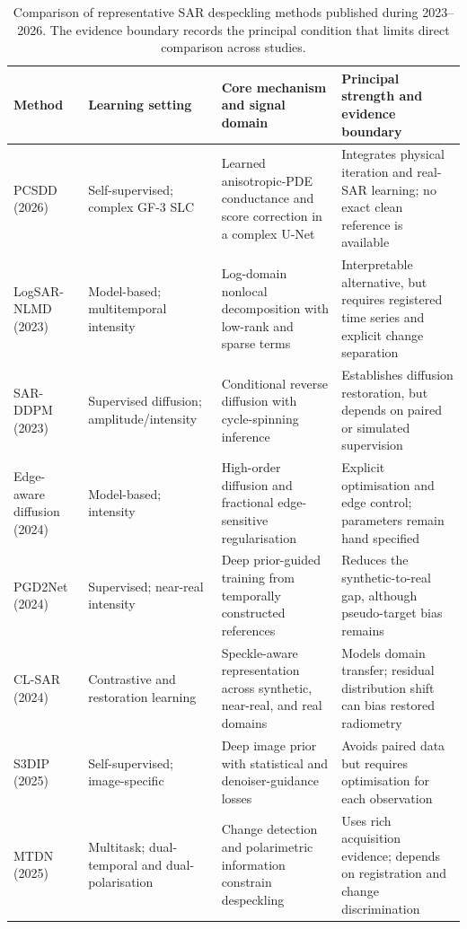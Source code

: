 \documentclass[11pt]{article}
\begin{document}
\begin{table}[t]
\centering
\caption{Comparison of representative SAR despeckling methods published during 2023--2026. The evidence boundary records the principal condition that limits direct comparison across studies.}
\label{tab:methods}
\footnotesize
\begin{tabularx}{\textwidth}{@{}L{0.16\textwidth}L{0.15\textwidth}L{0.25\textwidth}Y@{}}
\toprule
Method & Learning setting & Core mechanism and signal domain & Principal strength and evidence boundary \\
\midrule
PCSDD (2026) \cite{Xiong2026PCSDD} & Self-supervised; complex GF-3 SLC & Learned anisotropic-PDE conductance and score correction in a complex U-Net & Integrates physical iteration and real-SAR learning; no exact clean reference is available \\
LogSAR-NLMD (2023) \cite{Kang2023LogSAR} & Model-based; multitemporal intensity & Log-domain nonlocal decomposition with low-rank and sparse terms & Interpretable alternative, but requires registered time series and explicit change separation \\
SAR-DDPM (2023) \cite{Perera2023SARDDPM} & Supervised diffusion; amplitude/intensity & Conditional reverse diffusion with cycle-spinning inference & Establishes diffusion restoration, but depends on paired or simulated supervision \\
Edge-aware diffusion (2024) \cite{Bua2024EdgeAware} & Model-based; intensity & High-order diffusion and fractional edge-sensitive regularisation & Explicit optimisation and edge control; parameters remain hand specified \\
PGD2Net (2024) \cite{Guan2024NearReal} & Supervised; near-real intensity & Deep prior-guided training from temporally constructed references & Reduces the synthetic-to-real gap, although pseudo-target bias remains \\
CL-SAR (2024) \cite{Fang2024Contrastive} & Contrastive and restoration learning & Speckle-aware representation across synthetic, near-real, and real domains & Models domain transfer; residual distribution shift can bias restored radiometry \\
S3DIP (2025) \cite{Albisani2025S3DIP} & Self-supervised; image-specific & Deep image prior with statistical and denoiser-guidance losses & Avoids paired data but requires optimisation for each observation \\
MTDN (2025) \cite{Li2025MTDN} & Multitask; dual-temporal and dual-polarisation & Change detection and polarimetric information constrain despeckling & Uses rich acquisition evidence; depends on registration and change discrimination \\

\end{tabularx}
\end{table}
\end{document}
